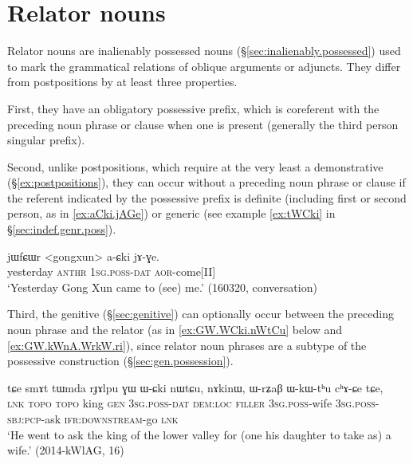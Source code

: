  
\section{Relator nouns}  \label{sec:relator.nouns}  
Relator nouns are inalienably possessed nouns (§\ref{sec:inalienably.possessed}) used to mark the grammatical relations of oblique arguments or adjuncts. They differ from postpositions by at least three properties. 

First, they have an obligatory possessive prefix, which is coreferent with the preceding noun phrase or clause when one is present (generally the third person singular  prefix). 

Second, unlike postpositions, which require at the very least a demonstrative (§\ref{ex:postpositions}), they can occur without a preceding noun phrase or clause if the referent indicated by the possessive prefix is definite (including first or second person, as in \ref{ex:aCki.jAGe}) or generic (see example \ref{ex:tWCki} in §\ref{sec:indef.genr.poss}). 

\begin{exe}
\ex \label{ex:aCki.jAGe}
\gll jɯfɕɯr <gongxun> a-ɕki jɤ-ɣe. \\
yesterday  \textsc{anthr} \textsc{1sg}.\textsc{poss}-\textsc{dat} \textsc{aor}-come[II] \\
\glt `Yesterday Gong Xun came to (see) me.' (160320, conversation)
\end{exe}

Third, the genitive  (§\ref{sec:genitive}) can optionally occur between the preceding noun phrase and the relator (as in \ref{ex:GW.WCki.nWtCu} below and \ref{ex:GW.kWnA.WrkW.ri}), since relator noun phrases are a subtype of the possessive construction (§\ref{sec:gen.possession}).

\begin{exe}
\ex \label{ex:GW.WCki.nWtCu}
\gll tɕe smɤt tɯmda rɟɤlpu ɣɯ ɯ-ɕki nɯtɕu, nɤkinɯ, ɯ-rʑaβ ɯ-kɯ-tʰu cʰɤ-ɕe tɕe, \\
\textsc{lnk}  \textsc{topo} \textsc{topo} king \textsc{gen} \textsc{3sg}.\textsc{poss}-\textsc{dat} \textsc{dem}:\textsc{loc} \textsc{filler} \textsc{3sg}.\textsc{poss}-wife \textsc{3sg}.\textsc{poss}-\textsc{sbj}:\textsc{pcp}-ask \textsc{ifr}:\textsc{downstream}-go \textsc{lnk} \\
\glt `He went to ask the king of the lower valley for (one his daughter to take as) a wife.' (2014-kWlAG, 16)
\end{exe}

